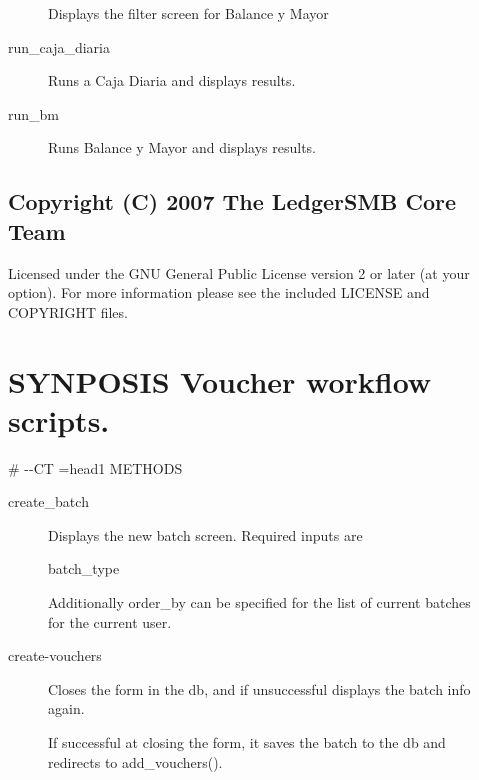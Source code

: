 \begin{description}
\begin{description}
Displays the filter screen for Balance y Mayor


\item[{run\_caja\_diaria}] \mbox{}

Runs a Caja Diaria and displays results.


\item[{run\_bm}] \mbox{}

Runs Balance y Mayor and displays results.

\end{description}
\subsection*{Copyright (C) 2007 The LedgerSMB Core Team\label{LedgerSMB::Scripts::lreports_co_Copyright_C_2007_The_LedgerSMB_Core_Team}}


Licensed under the GNU General Public License version 2 or later (at your 
option).  For more information please see the included LICENSE and COPYRIGHT 
files.

\section{SYNPOSIS
Voucher workflow scripts.\label{SYNPOSIS_Voucher_workflow_scripts_}}


\#      -{}-CT
=head1 METHODS

\begin{description}

\item[{create\_batch}] \mbox{}

Displays the new batch screen.  Required inputs are

\begin{description}

\item[{batch\_type}] \mbox{}\end{description}


Additionally order\_by can be specified for the list of current batches for the
current user.


\item[{create-vouchers}] \mbox{}

Closes the form in the db, and if unsuccessful displays the batch info again.



If successful at closing the form, it saves the batch to the db and redirects to
add\_vouchers().



\end{description}
\end{description}
